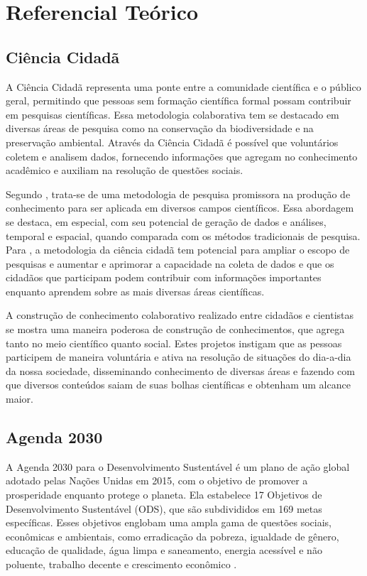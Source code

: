 \chapter{Referencial Teórico}\label{referencial-teorico}

\section{Ciência Cidadã}

A Ciência Cidadã representa uma ponte entre a comunidade científica e o público geral, permitindo que pessoas sem formação científica formal possam contribuir em pesquisas científicas. Essa metodologia colaborativa tem se destacado em diversas áreas de pesquisa como na conservação da biodiversidade e na preservação ambiental. Através da Ciência Cidadã é possível que voluntários coletem e analisem dados, fornecendo informações que agregam no conhecimento acadêmico e auxiliam na resolução de questões sociais.

Segundo , trata-se de uma metodologia de pesquisa promissora na produção de conhecimento para ser aplicada em diversos campos científicos. Essa abordagem se destaca, em especial, com seu potencial de  geração de dados e análises, temporal e espacial, quando comparada com os métodos tradicionais de pesquisa. Para , a metodologia da ciência cidadã tem potencial para ampliar o escopo de pesquisas e aumentar e aprimorar a capacidade na coleta de dados e que os cidadãos que participam podem contribuir com informações importantes enquanto aprendem sobre as mais diversas áreas científicas.

A construção de conhecimento colaborativo realizado entre cidadãos e cientistas se mostra uma maneira poderosa de construção de conhecimentos, que agrega tanto no meio científico quanto social. Estes projetos instigam que as pessoas participem de maneira voluntária e ativa na resolução de situações do dia-a-dia da nossa sociedade, disseminando conhecimento de diversas áreas e fazendo com que diversos conteúdos saiam de suas bolhas científicas e obtenham um alcance maior.

\section{Agenda 2030}

A Agenda 2030 para o Desenvolvimento Sustentável é um plano de ação global adotado pelas Nações Unidas em 2015, com o objetivo de promover a prosperidade enquanto protege o planeta. Ela estabelece 17 Objetivos de Desenvolvimento Sustentável (ODS), que são subdivididos em 169 metas específicas. Esses objetivos englobam uma ampla gama de questões sociais, econômicas e ambientais, como erradicação da pobreza, igualdade de gênero, educação de qualidade, água limpa e saneamento, energia acessível e não poluente, trabalho decente e crescimento econômico \cite{onu2015ods}.


